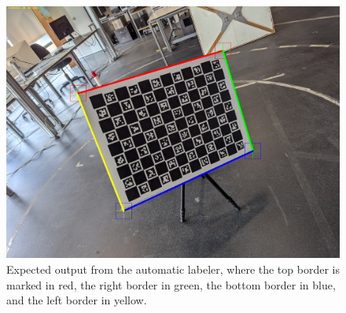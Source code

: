\begin{figure}[h]
    \centering
    \includegraphics[width=0.8\linewidth]{resources/images/pattern_28_lines.png}
    \caption{Expected output from the automatic labeler, where the top border is marked in red, the right border in green, the bottom border in blue, and the left border in yellow.}
    \label{fig:output}
\end{figure}
